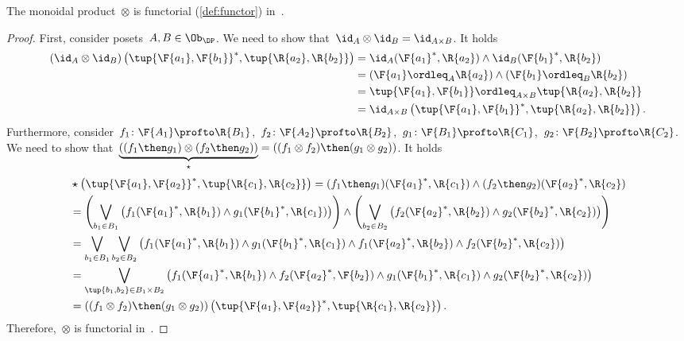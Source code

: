 \begin{lemma}
\label{lemma:monoidal_functorial}
The monoidal product~$\otimes$ is functorial (\cref{def:functor}) in~\DP.
\end{lemma}
\begin{proof}
First, consider posets~$A,B\in \Ob_\DP$. We need to show that~$\id_A\otimes \id_B = \id_{A\times B}$. It holds
\begin{equation}
\begin{aligned}
    \left( \id_{A}\otimes \id_{B}\right)
    \left( \tup{\F{a_1},\F{b_1}}^*,\tup{\R{a_2},\R{b_2}}\right)&=
    \id_A(\F{a_1}^*,\R{a_2})\wedge \id_B(\F{b_1}^*,\R{b_2})\\
    &=\left( \F{a_1}\ordleq_A \R{a_2}\right)\wedge \left( \F{b_1}\ordleq_B \R{b_2}\right)\\
    &=\tup{\F{a_1},\F{b_1}}\ordleq_{A\times B}\tup{\R{a_2},\R{b_2}}\\
    &=\id_{A\times B}\left( \tup{\F{a_1},\F{b_1}}^*,\tup{\R{a_2},\R{b_2}}\right).
\end{aligned}
\end{equation}
Furthermore, consider~$f_1\colon \F{A_1} \profto \R{B_1}$,~$f_2\colon \F{A_2}\profto \R{B_2}$,~$g_1\colon \F{B_1}\profto \R{C_1}$,~$g_2\colon \F{B_2}\profto \R{C_2}$. We need to show that~$\underbrace{\left( (f_1\then g_1) \otimes (f_2\then g_2)\right)}_{\star}=\left( (f_1\otimes f_2)\then (g_1\otimes g_2)\right)$. It holds
\begin{equation}
\begin{aligned}
    &\star \left( \tup{\F{a_1},\F{a_2}}^*,\tup{\R{c_1},\R{c_2}}\right)=(f_1\then g_1)(\F{a_1}^*,\R{c_1})\wedge (f_2\then g_2)(\F{a_2}^*,\R{c_2})\\
    &=\left(\bigvee_{b_1\in B_1}\left( f_1(\F{a_1}^*,\R{b_1})\wedge g_1(\F{b_1}^*,\R{c_1})\right)\right) \wedge\left(\bigvee_{b_2\in B_2}\left( f_2(\F{a_2}^*,\R{b_2})\wedge g_2(\F{b_2}^*,\R{c_2})\right)\right)\\
    &=\bigvee_{b_1\in B_1}\bigvee_{b_2\in B_2} \left(f_1(\F{a_1}^*,\R{b_1})\wedge g_1(\F{b_1}^*,\R{c_1})\wedge f_1(\F{a_2}^*,\R{b_2})\wedge f_2(\F{b_2}^*,\R{c_2}) \right)\\
    &=\bigvee_{\tup{b_1,b_2}\in B_1\times B_2} \left(f_1(\F{a_1}^*,\R{b_1})\wedge f_2(\F{a_2}^*,\F{b_2})\wedge g_1(\F{b_1}^*,\R{c_1})\wedge g_2(\F{b_2}^*,\R{c_2}) \right)\\
    &=\left( (f_1\otimes f_2)\then (g_1\otimes g_2)\right)\left(\tup{\F{a_1},\F{a_2}}^*,\tup{\R{c_1},\R{c_2}} \right).
\end{aligned}
\end{equation}
Therefore,~$\otimes$ is functorial in~\DP.
\end{proof}


